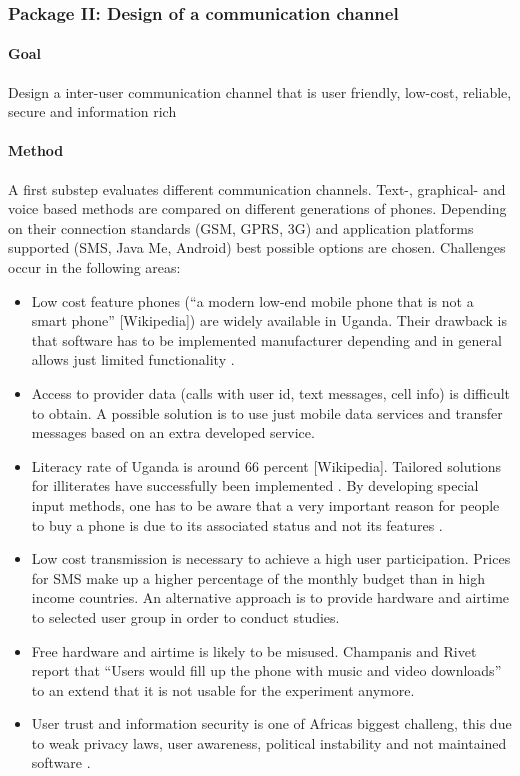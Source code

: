 \documentclass[11pt]{article}
\begin{document}
\subsubsection*{Package II: Design of a communication channel}
\paragraph{Goal} Design a inter-user communication channel that is user friendly, low-cost, reliable, secure and information rich
\paragraph{Method} A first substep evaluates different communication channels. Text-, graphical- and voice based methods are compared on different generations of phones. Depending on their connection standards (GSM, GPRS, 3G) and application platforms supported (SMS, Java Me, Android) best possible options are chosen. Challenges occur in the following areas:
\begin{itemize}
 \item Low cost feature phones (``a modern low-end mobile phone that is not a smart phone'' [Wikipedia]) are widely available in Uganda. Their drawback is that software has to be implemented manufacturer depending and in general allows just limited functionality \cite{champanis2012reporting}.
 \item Access to provider data (calls with user id, text messages, cell info) is difficult to obtain. A possible solution is to use just mobile data services and transfer messages based on an extra developed service.
 \item Literacy rate of Uganda is around 66 percent [Wikipedia]. Tailored solutions for illiterates have successfully been implemented \cite{brown2012water}. By developing special input methods, one has to be aware that a very important reason for people to buy a phone is due to its associated status and not its features \cite{knoche2012text}.
 \item Low cost transmission is necessary to achieve a high user participation. Prices for SMS make up a higher percentage of the monthly budget than in high income countries. An alternative approach is to provide hardware and airtime to selected user group in order to conduct studies.
 \item Free hardware and airtime is likely to be misused. Champanis and Rivet report that ``Users would fill up the phone with music and video downloads'' \cite{champanis2012reporting} to an extend that it is not usable for the experiment anymore.
 \item User trust and information security is one of Africas biggest challeng, this due to weak privacy laws, user awareness, political instability and not maintained software \cite{goodman2010coming}.
\end{itemize}
\end{document}
